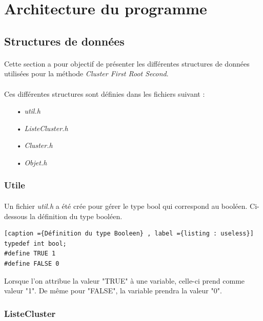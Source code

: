 \documentclass[twoside,UTF8]{EPURapport}
\begin{document}
\section{Architecture du programme}

\subsection{Structures de données}
\label{subsec:struct}

\paragraph{} Cette section a pour objectif de présenter les différentes structures de données utilisées pour la méthode \textit{Cluster First Root Second}.

\paragraph{}Ces différentes structures sont définies dans les fichiers suivant : 
\begin{itemize}
\item[•] \textit{util.h}
\item[•]\textit{ListeCluster.h}
\item[•]\textit{Cluster.h}
\item[•]\textit{Objet.h}
\end{itemize}

\subsubsection{Utile}
\label{subsec:util.h}

\paragraph{}
Un fichier \textit{util.h} a été crée pour gérer le type bool qui correspond au booléen. 
Ci-dessous la définition du type booléen. 
\begin{lstlisting}[caption ={Définition du type Booleen} , label ={listing : useless}]
typedef int bool;
#define TRUE 1
#define FALSE 0
\end{lstlisting}

Lorsque l'on attribue la valeur "TRUE" à une variable, celle-ci prend comme valeur "1". De m\^eme pour "FALSE", la variable prendra la valeur "0".


\subsubsection{ListeCluster}
\end{document}
